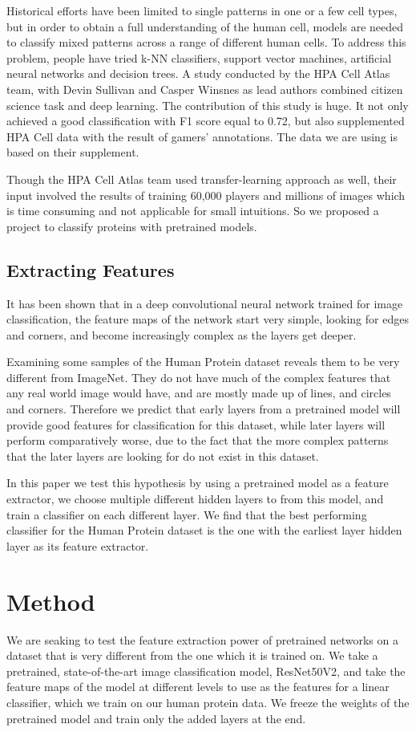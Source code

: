 \documentclass{article}
\begin{document}
Historical efforts have been limited to single patterns in one or a few cell types, but in order to obtain a full understanding of the human cell, models are needed to classify mixed patterns across a range of different human cells. To address this problem, people have tried k-NN classifiers, support vector machines, artificial neural networks and decision trees. A study conducted by the HPA Cell Atlas team, with Devin Sullivan and Casper Winsnes as lead authors combined citizen science task and deep learning. The contribution of this study is huge. It not only achieved a good classification with F1 score equal to 0.72, but also supplemented HPA Cell data with the result of gamers’ annotations. The data we are using is based on their supplement.

Though the HPA Cell Atlas team used transfer-learning approach as well, their input involved the results of training 60,000 players and millions of images which is time consuming and not applicable for small intuitions. So we proposed a project to classify proteins with pretrained models.

  
\subsection{Extracting Features}
It has been shown that in a deep convolutional neural network trained for image classification, the
feature maps of the network start very simple, looking for edges and corners, and become increasingly
complex as the layers get deeper. 

Examining some samples of the Human Protein dataset reveals them to be very different from ImageNet. They 
do not have much of the complex features that any real world image would have, and are mostly made up of 
lines, and circles and corners. Therefore we predict that early layers from a pretrained model will
provide good features for classification for this dataset, while later layers will perform comparatively worse, 
due to the fact that the more complex patterns that the later layers are looking for do not exist in this 
dataset. 

In this paper we test this hypothesis by using a pretrained model as a feature extractor, we choose multiple different
hidden layers to from this model, and train a classifier on each different layer. We find that the best performing classifier
for the Human Protein dataset is the one with the earliest layer hidden layer as its feature extractor.
\section{Method}
We are seaking to test the feature extraction power of pretrained networks on 
a dataset that is very different from the one which it is trained on. We take 
a pretrained, state-of-the-art image classification model, ResNet50V2, and take
the feature maps of the model at different levels to use as the features for 
a linear classifier, which we train on our human protein data. We freeze the weights
of the pretrained model and train only the added layers at the end.
\end{document}
